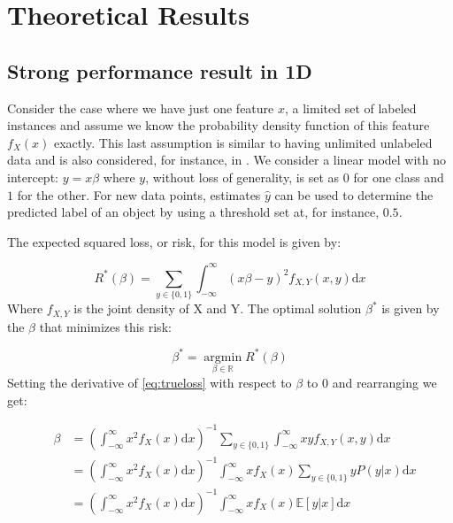 \documentclass{llncs}
\begin{document}
\section{Theoretical Results}

\subsection{Strong performance result in 1D}
Consider the case where we have just one feature $x$, a limited set of labeled instances and assume we know the probability density function of this feature $f_X(x)$ exactly. This last assumption is similar to having unlimited unlabeled data and is also considered, for instance, in \cite{Sokolovska2008}. We consider a linear model with no intercept: $y = x \beta$ where $y$, without loss of generality, is set as $0$ for one class and $1$ for the other. For new data points, estimates $\hat{y}$ can be used to determine the predicted label of an object by using a threshold set at, for instance, $0.5$.

The expected squared loss, or risk, for this model is given by:

\begin{equation} \label{eq:trueloss}
R^*(\beta) = \sum_{y \in \{0,1\}}{ \int_{-\infty}^{\infty}(x \beta - y)^2  f_{X,Y}(x,y)  \mathrm{d}x}
\end{equation}
Where  $f_{X,Y}$ is the joint density of X and Y. The optimal solution $\beta^*$ is given by the $\beta$ that minimizes this risk:

\begin{equation} \label{eq:bayesoptimal}
\beta^* = \operatorname*{argmin}_{\beta \in \mathbb{R}} R^*(\beta)
\end{equation}
Setting the derivative of \eqref{eq:trueloss} with respect to $\beta$ to $0$ and rearranging we get:

\begin{eqnarray}
&\beta & = \left( \int_{-\infty}^{\infty} { x^2 f_X(x) \mathrm{d}x} \right)^{-1} \sum_{y \in \{0,1\}} \int_{-\infty}^{\infty} { x y f_{X,Y}(x,y) \mathrm{d}x } \\
& & =    \left( \int_{-\infty}^{\infty} { x^2 f_X(x) \mathrm{d}x} \right)^{-1}  \int_{-\infty}^{\infty} { x f_X(x) \sum_{y \in \{0,1\}} y P(y|x) \mathrm{d}x} \\
& & =   \left( \int_{-\infty}^{\infty} { x^2 f_X(x) \mathrm{d}x} \right)^{-1}  \int_{-\infty}^{\infty} { x f_X(x) \mathbb{E}[y|x] \mathrm{d}x} \label{eqn:sslsolution}
\end{eqnarray}
\end{document}
